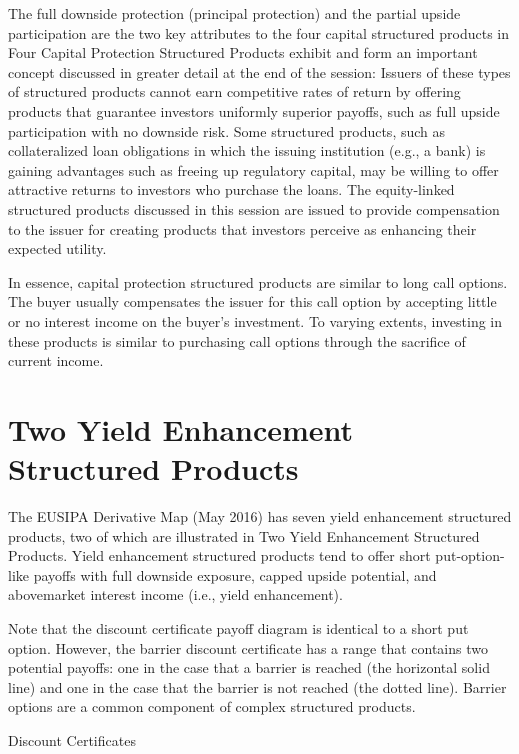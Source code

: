 \documentclass[11pt]{article}
\begin{document}
The full downside protection (principal protection) and the partial upside participation are the two key attributes to the four capital structured products in Four Capital Protection Structured Products exhibit and form an important concept discussed in greater detail at the end of the session: Issuers of these types of structured products cannot earn competitive rates of return by offering products that guarantee investors uniformly superior payoffs, such as full upside participation with no downside risk. Some structured products, such as collateralized loan obligations in which the issuing institution (e.g., a bank) is gaining advantages such as freeing up regulatory capital, may be willing to offer attractive returns to investors who purchase the loans. The equity-linked structured products discussed in this session are issued to provide compensation to the issuer for creating products that investors perceive as enhancing their expected utility.

In essence, capital protection structured products are similar to long call options. The buyer usually compensates the issuer for this call option by accepting little or no interest income on the buyer's investment. To varying extents, investing in these products is similar to purchasing call options through the sacrifice of current income.

\section*{Two Yield Enhancement Structured Products}
The EUSIPA Derivative Map (May 2016) has seven yield enhancement structured products, two of which are illustrated in Two Yield Enhancement Structured Products. Yield enhancement structured products tend to offer short put-option-like payoffs with full downside exposure, capped upside potential, and abovemarket interest income (i.e., yield enhancement).

Note that the discount certificate payoff diagram is identical to a short put option. However, the barrier discount certificate has a range that contains two potential payoffs: one in the case that a barrier is reached (the horizontal solid line) and one in the case that the barrier is not reached (the dotted line). Barrier options are a common component of complex structured products.

Discount Certificates
\end{document}
